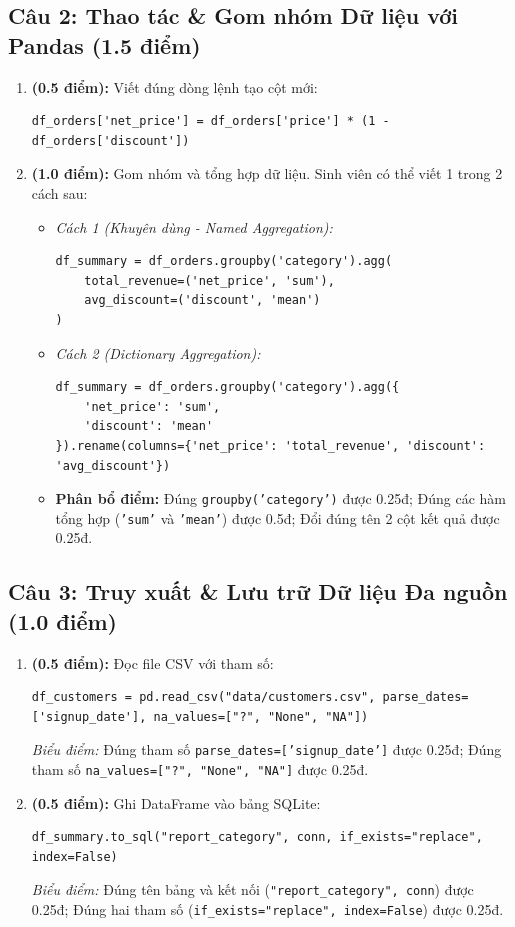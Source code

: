 \documentclass[11pt,a4paper]{article}
\begin{document}
\subsection*{Câu 2: Thao tác \& Gom nhóm Dữ liệu với Pandas (1.5 điểm)}
\begin{enumerate}[label=\textbf{\alph*)}]
  \item \textbf{(0.5 điểm):} Viết đúng dòng lệnh tạo cột mới:
\begin{lstlisting}
df_orders['net_price'] = df_orders['price'] * (1 - df_orders['discount'])
\end{lstlisting}

  \item \textbf{(1.0 điểm):} Gom nhóm và tổng hợp dữ liệu. Sinh viên có thể viết 1 trong 2 cách sau:
  \begin{itemize}
    \item \textit{Cách 1 (Khuyên dùng - Named Aggregation):}
\begin{lstlisting}
df_summary = df_orders.groupby('category').agg(
    total_revenue=('net_price', 'sum'),
    avg_discount=('discount', 'mean')
)
\end{lstlisting}
    \item \textit{Cách 2 (Dictionary Aggregation):}
\begin{lstlisting}
df_summary = df_orders.groupby('category').agg({
    'net_price': 'sum',
    'discount': 'mean'
}).rename(columns={'net_price': 'total_revenue', 'discount': 'avg_discount'})
\end{lstlisting}
    \item \textbf{Phân bổ điểm:} Đúng \texttt{groupby('category')} được 0.25đ; Đúng các hàm tổng hợp (\texttt{'sum'} và \texttt{'mean'}) được 0.5đ; Đổi đúng tên 2 cột kết quả được 0.25đ.
  \end{itemize}
\end{enumerate}

\subsection*{Câu 3: Truy xuất \& Lưu trữ Dữ liệu Đa nguồn (1.0 điểm)}
\begin{enumerate}[label=\textbf{\alph*)}]
  \item \textbf{(0.5 điểm):} Đọc file CSV với tham số:
\begin{lstlisting}
df_customers = pd.read_csv("data/customers.csv", parse_dates=['signup_date'], na_values=["?", "None", "NA"])
\end{lstlisting}
  \textit{Biểu điểm:} Đúng tham số \texttt{parse\_dates=['signup\_date']} được 0.25đ; Đúng tham số \texttt{na\_values=["?", "None", "NA"]} được 0.25đ.

  \item \textbf{(0.5 điểm):} Ghi DataFrame vào bảng SQLite:
\begin{lstlisting}
df_summary.to_sql("report_category", conn, if_exists="replace", index=False)
\end{lstlisting}
  \textit{Biểu điểm:} Đúng tên bảng và kết nối (\texttt{"report\_category", conn}) được 0.25đ; Đúng hai tham số (\texttt{if\_exists="replace", index=False}) được 0.25đ.
\end{enumerate}
\end{document}
